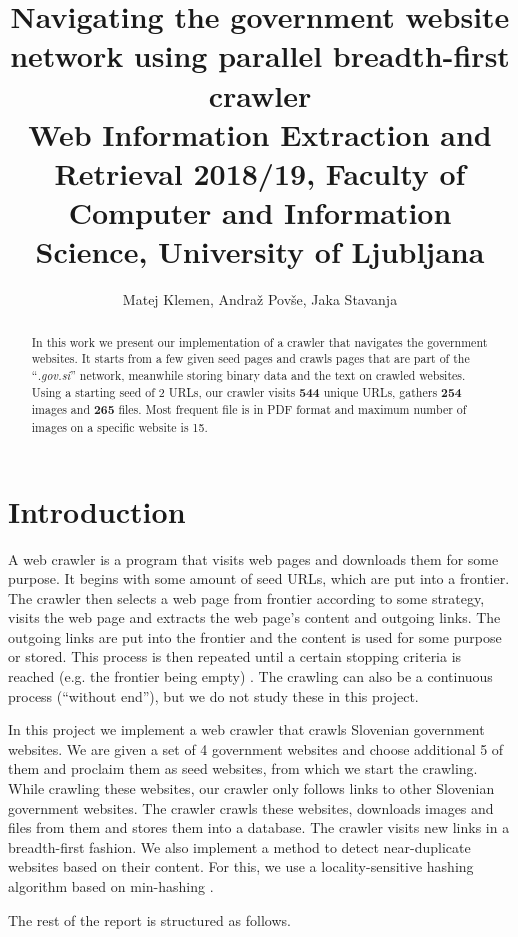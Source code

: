 \documentclass[9pt]{IEEEtran}
\title{\vspace{0ex} %
Navigating the government website network using parallel breadth-first crawler
\\ \normalsize{Web Information Extraction and Retrieval 2018/19, Faculty of Computer and Information Science, University of Ljubljana}}
\author{ %
Matej Klemen, Andraž Povše, Jaka Stavanja
\vspace{-4.0ex}
}
\begin{document}
\maketitle

\begin{abstract}
In this work we present our implementation of a crawler that navigates the government websites.
It starts from a few given seed pages and crawls pages that are part of the ``\textit{.gov.si}'' network, meanwhile storing binary data and the text on crawled websites.
Using a starting seed of 2 URLs, our crawler visits \textbf{544} unique URLs, gathers \textbf{254} images and \textbf{265} files. Most frequent file is in PDF format and maximum number of images on a specific website is 15.
\end{abstract}

\section{Introduction}

A web crawler is a program that visits web pages and downloads them for some purpose.
It begins with some amount of seed URLs, which are put into a frontier.
The crawler then selects a web page from frontier according to some strategy, visits the web page and extracts the web page's content and outgoing links.
The outgoing links are put into the frontier and the content is used for some purpose or stored.
This process is then repeated until a certain stopping criteria is reached (e.g. the frontier being empty) \cite{Manning2008}.
The crawling can also be a continuous process (``without end''), but we do not study these in this project. 

In this project we implement a web crawler that crawls Slovenian government websites. 
We are given a set of 4 government websites and choose additional 5 of them and proclaim them as seed websites, from which we start the crawling.
While crawling these websites, our crawler only follows links to other Slovenian government websites.
The crawler crawls these websites, downloads images and files from them and stores them into a database. 
The crawler visits new links in a breadth-first fashion.
We also implement a method to detect near-duplicate websites based on their content.
For this, we use a locality-sensitive hashing algorithm based on min-hashing \cite{Gionis1999}.

The rest of the report is structured as follows.
\end{document}
